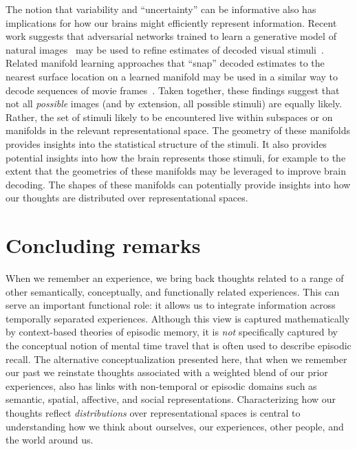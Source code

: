 \documentclass{article}
\begin{document}
The notion that variability and ``uncertainty'' can be informative also has implications for how our brains might efficiently represent information.  Recent work suggests that adversarial networks trained to learn a generative model of natural images~\citep[e.g., ][]{GatyEtal16, IsolEtal17} may be used to refine estimates of decoded visual stimuli~\citep{StYvNase18}. Related manifold learning approaches that ``snap'' decoded estimates to the nearest surface location on a learned manifold may be used in a similar way to decode sequences of movie frames~\citep{HeusEtal18a}.  Taken together, these findings suggest that not all \textit{possible} images (and by extension, all possible stimuli) are equally likely.  Rather, the set of stimuli likely to be encountered live within subspaces or on manifolds in the relevant representational space.  The geometry of these manifolds provides insights into the statistical structure of the stimuli.  It also provides potential insights into how the brain represents those stimuli, for example to the extent that the geometries of these manifolds may be leveraged to improve brain decoding.  The shapes of these manifolds can potentially provide insights into how our thoughts are distributed over representational spaces.

\section*{Concluding remarks}
When we remember an experience, we bring back thoughts related to a range of other semantically, conceptually, and functionally related experiences.  This can serve an important functional role: it allows us to integrate information across temporally separated experiences.  Although this view is captured mathematically by context-based theories of episodic memory, it is \textit{not} specifically captured by the conceptual notion of mental time travel that is often used to describe episodic recall.  The alternative conceptualization presented here, that when we remember our past we reinstate thoughts associated with a weighted blend of our prior experiences, also has links with non-temporal or episodic domains such as semantic, spatial, affective, and social representations.  Characterizing how our thoughts reflect \textit{distributions} over representational spaces is central to understanding how we think about ourselves, our experiences, other people, and the world around us.
\end{document}
